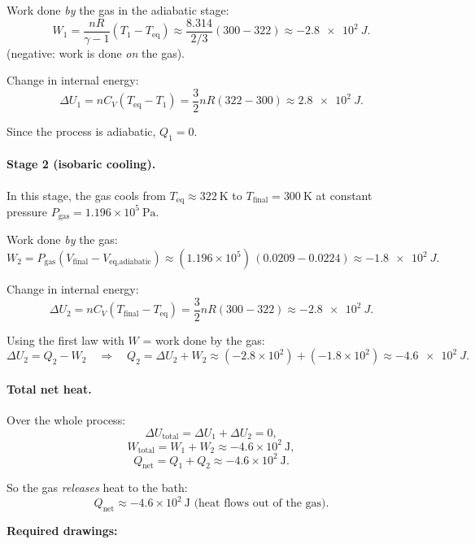 \documentclass[11pt]{article}
\begin{document}
Work done \emph{by} the gas in the adiabatic stage:
\[
W_1 = \frac{nR}{\gamma-1}(T_1 - T_{\text{eq}})
\approx \frac{8.314}{2/3}(300 - 322)
\approx \SI{-2.8e2}{J}.
\]
(negative: work is done \emph{on} the gas).

Change in internal energy:
\[
\Delta U_1 = nC_V(T_{\text{eq}} - T_1)
= \frac{3}{2}nR(322 - 300)
\approx \SI{2.8e2}{J}.
\]

Since the process is adiabatic, \(Q_1 = 0\).

\paragraph{Stage 2 (isobaric cooling).}
In this stage, the gas cools from \(T_{\text{eq}} \approx 322~\text{K}\) to
\(T_{\text{final}} = 300~\text{K}\) at constant pressure
\(P_{\text{gas}} = 1.196\times 10^5\ \text{Pa}\).

Work done \emph{by} the gas:
\[
W_2 = P_{\text{gas}}(V_{\text{final}} - V_{\text{eq,adiabatic}})
\approx (1.196\times 10^5)\,(0.0209 - 0.0224)
\approx \SI{-1.8e2}{J}.
\]

Change in internal energy:
\[
\Delta U_2 = nC_V(T_{\text{final}} - T_{\text{eq}})
= \frac{3}{2}nR(300 - 322)
\approx \SI{-2.8e2}{J}.
\]

Using the first law with \(W\) = work done by the gas:
\[
\Delta U_2 = Q_2 - W_2
\quad\Rightarrow\quad
Q_2 = \Delta U_2 + W_2
\approx (-2.8\times 10^2) + (-1.8\times 10^2)
\approx \SI{-4.6e2}{J}.
\]

\paragraph{Total net heat.}
Over the whole process:
\[
\Delta U_{\text{total}} = \Delta U_1 + \Delta U_2 = 0,
\]
\[
W_{\text{total}} = W_1 + W_2 \approx -4.6\times 10^2\ \text{J},
\]
\[
Q_{\text{net}} = Q_1 + Q_2 \approx -4.6\times 10^2\ \text{J}.
\]

So the gas \emph{releases} heat to the bath:
\[
\boxed{Q_{\text{net}} \approx -4.6\times 10^2~\text{J (heat flows out of the gas)}}.
\]

\bigskip
\noindent\textbf{Required drawings:}
\end{document}
